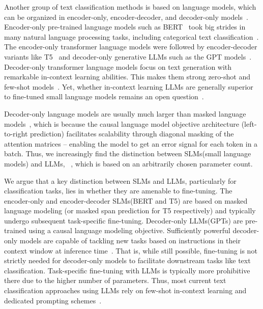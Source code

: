 \documentclass[lettersize,journal]{IEEEtran}
\newcommand{\SLMs}{SLMs\xspace}
\newcommand{\LLMs}{LLMs\xspace}
\begin{document}
Another group of text classification methods is based on language models, which can be organized in encoder-only, encoder-decoder, and decoder-only models~\cite{yang2023harnessing}.
Encoder-only pre-trained language models such as BERT~\cite{DBLP:conf/naacl/DevlinCLT19} took big strides in many natural language processing tasks, including categorical text classification~\cite{galkescherp-acl2022}. 
The encoder-only transformer language models were followed by encoder-decoder variants like T5~\cite{T5} and decoder-only generative \LLMs such as the GPT models~\cite{DBLP:journals/corr/abs-2303-08774,DBLP:conf/nips/BrownMRSKDNSSAA20}.
Decoder-only transformer language models focus on text generation with remarkable in-context learning abilities.
This makes them strong zero-shot and few-shot models~\cite{carp,DBLP:conf/iclr/PatelLRCRC23,wei2022finetuned,DBLP:conf/nips/BrownMRSKDNSSAA20}. 
Yet, whether in-context learning LLMs are generally superior to fine-tuned small language models remains an open question~\cite{
DBLP:conf/emnlp/PecherSB25-100-samples,
DBLP:conf/acl/QoribMN24,
bucher2024finetunedsmallllmsstill,
lepagnol2024smalllanguagemodelsgood,
liu2024llmembedrethinkinglightweightllms,
edwards2024language,
li2023label}.

Decoder-only language models are usually much larger than masked language models~\cite{DBLP:conf/nips/BrownMRSKDNSSAA20}, which is because the causal language model objective architecture (left-to-right prediction) facilitates scalability through diagonal masking of the attention matrices -- enabling the model to get an error signal for each token in a batch.
Thus, we increasingly find the distinction between \SLMs (small language models) and \LLMs, \eg~\cite{DBLP:conf/aaai/Hu0CSLW024,DBLP:journals/corr/abs-2406-17534-retrieval-style,DBLP:journals/corr/abs-2402-16844}, which is based on an arbitrarily chosen parameter count.

We argue that a key distinction between \SLMs and \LLMs, particularly for classification tasks, lies in whether they are amenable to fine-tuning.
The encoder-only and encoder-decoder \SLMs (\eg BERT and T5) are based on masked language modeling (or masked span prediction for T5 respectively) and typically undergo subsequent task-specific fine-tuning. Decoder-only \LLMs (\eg GPTs) are pre-trained using a causal language modeling objective.
Sufficiently powerful decoder-only models are capable of tackling new tasks based on instructions in their context window at inference time~\cite{DBLP:conf/nips/BrownMRSKDNSSAA20}. That is, while still possible, fine-tuning is not strictly needed for decoder-only models to facilitate downstream tasks like text classification. 
Task-specific fine-tuning with \LLMs is typically more prohibitive there due to the higher number of parameters.
Thus, most current text classification approaches using \LLMs rely on few-shot in-context learning and dedicated prompting schemes~\cite{carp}.
\end{document}
